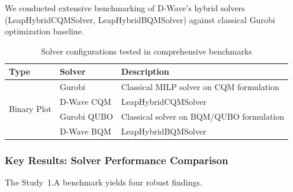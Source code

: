 \documentclass{oqireport}
\begin{document}
We conducted extensive benchmarking of D-Wave's hybrid solvers (LeapHybridCQMSolver, LeapHybridBQMSolver) against classical Gurobi optimization baseline.




\begin{table}[H]
\centering
\caption{Solver configurations tested in comprehensive benchmarks}
\label{tab:solver_configs}
\begin{tabular}{llp{6cm}}
\toprule
\textbf{Type} & \textbf{Solver} & \textbf{Description} \\
\midrule
\multirow{4}{*}{Binary Plot} & Gurobi & Classical MILP solver on CQM formulation \\
& D-Wave CQM & LeapHybridCQMSolver \\
& Gurobi QUBO & Classical solver on BQM/QUBO formulation \\
& D-Wave BQM & LeapHybridBQMSolver \\
\bottomrule
\end{tabular}
\end{table}

\subsubsection{Key Results: Solver Performance Comparison}

The Study~1.A benchmark yields four robust findings.
\end{document}
